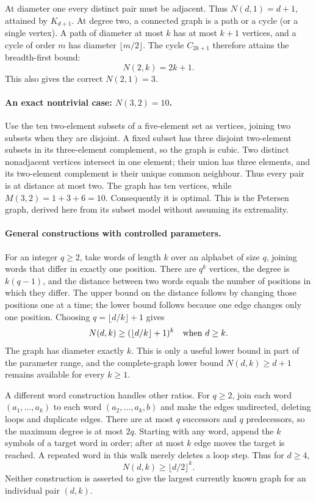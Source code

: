 \documentclass[11pt,a4paper]{article}
\begin{document}
At diameter one every distinct pair must be adjacent. Thus
$N(d,1)=d+1$, attained by $K_{d+1}$. At degree two, a connected
graph is a path or a cycle (or a single vertex). A path of diameter
at most $k$ has at most $k+1$ vertices, and a cycle of order $m$ has
diameter $\lfloor m/2\rfloor$. The cycle $C_{2k+1}$ therefore
attains the breadth-first bound:
\[
                        N(2,k)=2k+1.
\]
This also gives the correct $N(2,1)=3$.

\paragraph{An exact nontrivial case: $N(3,2)=10$.}
Use the ten two-element subsets of a five-element set as vertices,
joining two subsets when they are disjoint. A fixed subset has three
disjoint two-element subsets in its three-element complement, so the
graph is cubic. Two distinct nonadjacent vertices intersect in one
element; their union has three elements, and its two-element complement
is their unique common neighbour. Thus every pair is at distance at
most two. The graph has ten vertices, while $M(3,2)=1+3+6=10$.
Consequently it is optimal. This is the Petersen graph, derived here
from its subset model without assuming its extremality.

\paragraph{General constructions with controlled parameters.}
For an integer $q\ge2$, take words of length $k$ over an alphabet of
size $q$, joining words that differ in exactly one position. There
are $q^k$ vertices, the degree is $k(q-1)$, and the distance between
two words equals the number of positions in which they differ.
The upper bound on the distance follows by changing those positions
one at a time; the lower bound follows because one edge changes only
one position. Choosing $q=\lfloor d/k\rfloor+1$ gives
\[
                N(d,k)\ge (\lfloor d/k\rfloor+1)^k
                \quad\hbox{when }d\ge k.
\]
The graph has diameter exactly $k$. This is only a useful lower bound
in part of the parameter range, and the complete-graph lower bound
$N(d,k)\ge d+1$ remains available for every $k\ge1$.

A different word construction handles other ratios. For $q\ge2$,
join each word $(a_1,\ldots,a_k)$ to each word
$(a_2,\ldots,a_k,b)$ and make the edges undirected, deleting loops
and duplicate edges. There are at most $q$ successors and $q$
predecessors, so the maximum degree is at most $2q$. Starting with
any word, append the $k$ symbols of a target word in order; after
at most $k$ edge moves the target is reached. A repeated word in this
walk merely deletes a loop step. Thus for $d\ge4$,
\[
                       N(d,k)\ge\lfloor d/2\rfloor^k.
\]
Neither construction is asserted to give the largest currently known
graph for an individual pair $(d,k)$.
\end{document}
